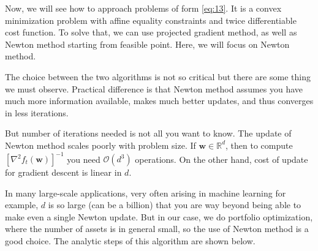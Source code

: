 \documentclass{beamer}
\begin{document}
\begin{frame}


\justifying
Now, we will see how to approach problems of form \eqref{eq:13}. It is a convex minimization problem with affine equality constraints and twice differentiable cost function. To solve that, we can use projected gradient method, as well as Newton method starting from feasible point. Here, we will focus on Newton method.

\vspace{0.8cm}
\justifying
The choice between the two algorithms is not so critical but there are some thing we must observe. Practical difference is that Newton method assumes you have much more information available, makes much better updates, and thus converges in less iterations.

\end{frame}



\begin{frame}

\justifying
But number of iterations needed is not all you want to know. The update of Newton method scales poorly with problem size. If $\mathbf{w} \in \mathbb{R}^{d}$, then to compute $[\nabla^{2} f_{t}\left(\mathbf{w}\right)]^{-1}$ you need $\mathcal{O}\left(d^{3}\right)$ operations. On the other hand, cost of update for gradient descent is linear in $d$.

\vspace{0.8cm}
\justifying
In many large-scale applications, very often arising in machine learning for example, $d$ is so large (can be a billion) that you are way beyond being able to make even a single Newton update. But in our case, we do portfolio optimization, where the number of assets is in general small, so the use of Newton method is a good choice. The analytic steps of this algorithm are shown below.

\end{frame}
\end{document}
